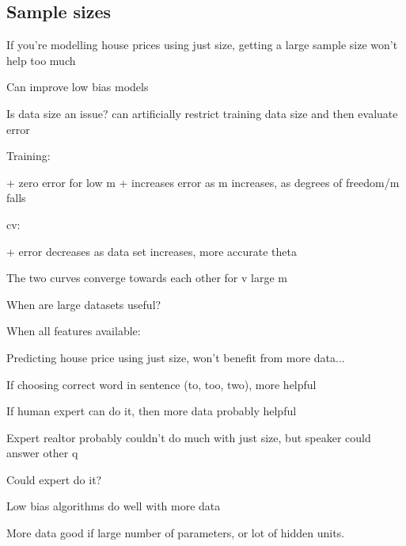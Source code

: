 
\subsection{Sample sizes}

If you're modelling house prices using just size, getting a large sample size won't help too much

Can improve low bias models

Is data size an issue? can artificially restrict training data size and then evaluate error

Training:

+ zero error for low m
+ increases error as m increases, as degrees of freedom/m falls

cv:

+ error decreases as data set increases, more accurate theta

The two curves converge towards each other for v large m

When are large datasets useful?

When all features available:

Predicting house price using just size, won't benefit from more data...

If choosing correct word in sentence (to, too, two), more helpful

If human expert can do it, then more data probably helpful

Expert realtor probably couldn't do much with just size, but speaker could answer other q

Could expert do it?

Low bias algorithms do well with more data

More data good if large number of parameters, or lot of hidden units.

